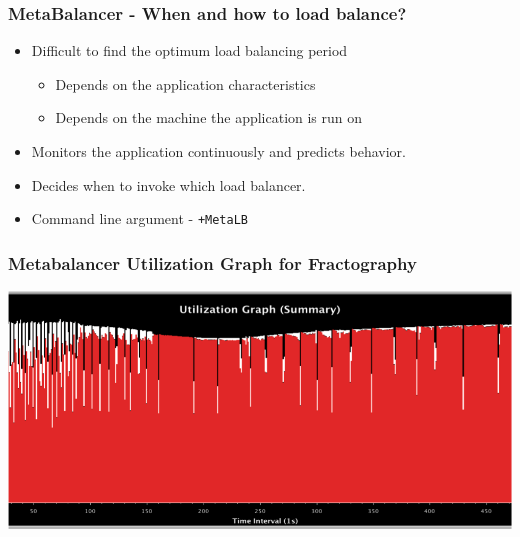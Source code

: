 
\begin{frame}[fragile]
\frametitle{MetaBalancer - When and how to load balance?}
\begin{itemize}    
    \item Difficult to find the optimum load balancing period
    \begin{itemize}
       \item Depends on the application characteristics
       \item Depends on the machine the application is run on
    \end{itemize}
    
    \item Monitors the application continuously and predicts behavior.
    \item Decides when to invoke which load balancer.
    \item Command line argument - \texttt{+MetaLB}
\end{itemize}
\end{frame}

\begin{frame}[fragile]
\frametitle{Metabalancer Utilization Graph for Fractography}
\includegraphics[width=\textwidth]{figures/meta-util}
\end{frame}
